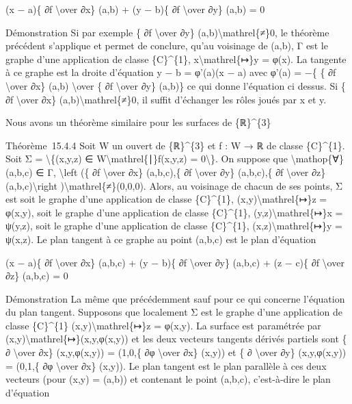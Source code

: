 \documentclass[]{article}
\begin{document}
(x − a)\{ ∂f \textbackslash{}over ∂x\} (a,b) + (y − b)\{ ∂f
\textbackslash{}over ∂y\} (a,b) = 0

Démonstration Si par exemple \{ ∂f \textbackslash{}over ∂y\}
(a,b)\textbackslash{}mathrel\{≠\}0, le théorème précédent s'applique et
permet de conclure, qu'au voisinage de (a,b), Γ est le graphe d'une
application de classe \{C\}\^{}\{1\}, x\textbackslash{}mathrel\{↦\}y =
φ(x). La tangente à ce graphe est la droite d'équation y − b = φ'(a)(x −
a) avec φ'(a) = −\{ \{ ∂f \textbackslash{}over ∂x\} (a,b)
\textbackslash{}over \{ ∂f \textbackslash{}over ∂y\} (a,b)\} ce qui
donne l'équation ci dessus. Si \{ ∂f \textbackslash{}over ∂x\}
(a,b)\textbackslash{}mathrel\{≠\}0, il suffit d'échanger les rôles joués
par x et y.

Nous avons un théorème similaire pour les surfaces de \{ℝ\}\^{}\{3\}

Théorème~15.4.4 Soit W un ouvert de \{ℝ\}\^{}\{3\} et f : W → ℝ de
classe \{C\}\^{}\{1\}. Soit Σ = \textbackslash{}\{(x,y,z) ∈
W\textbackslash{}mathrel\{∣\}f(x,y,z) = 0\textbackslash{}\}. On suppose
que \textbackslash{}mathop\{∀\}(a,b,c) ∈ Γ, \textbackslash{}left (\{ ∂f
\textbackslash{}over ∂x\} (a,b,c),\{ ∂f \textbackslash{}over ∂y\}
(a,b,c),\{ ∂f \textbackslash{}over ∂z\} (a,b,c)\textbackslash{}right
)\textbackslash{}mathrel\{≠\}(0,0,0). Alors, au voisinage de chacun de
ses points, Σ est soit le graphe d'une application de classe
\{C\}\^{}\{1\}, (x,y)\textbackslash{}mathrel\{↦\}z = φ(x,y), soit le
graphe d'une application de classe \{C\}\^{}\{1\},
(y,z)\textbackslash{}mathrel\{↦\}x = ψ(y,z), soit le graphe d'une
application de classe \{C\}\^{}\{1\}, (x,z)\textbackslash{}mathrel\{↦\}y
= ψ(x,z). Le plan tangent à ce graphe au point (a,b,c) est le plan
d'équation

(x − a)\{ ∂f \textbackslash{}over ∂x\} (a,b,c) + (y − b)\{ ∂f
\textbackslash{}over ∂y\} (a,b,c) + (z − c)\{ ∂f \textbackslash{}over
∂z\} (a,b,c) = 0

Démonstration La même que précédemment sauf pour ce qui concerne
l'équation du plan tangent. Supposons que localement Σ est le graphe
d'une application de classe \{C\}\^{}\{1\}
(x,y)\textbackslash{}mathrel\{↦\}z = φ(x,y). La surface est paramétrée
par (x,y)\textbackslash{}mathrel\{↦\}(x,y,φ(x,y)) et les deux vecteurs
tangents dérivés partiels sont \{ ∂ \textbackslash{}over ∂x\}
(x,y,φ(x,y)) = (1,0,\{ ∂φ \textbackslash{}over ∂x\} (x,y)) et \{ ∂
\textbackslash{}over ∂y\} (x,y,φ(x,y)) = (0,1,\{ ∂φ \textbackslash{}over
∂x\} (x,y)). Le plan tangent est le plan parallèle à ces deux vecteurs
(pour (x,y) = (a,b)) et contenant le point (a,b,c), c'est-à-dire le plan
d'équation
\end{document}
